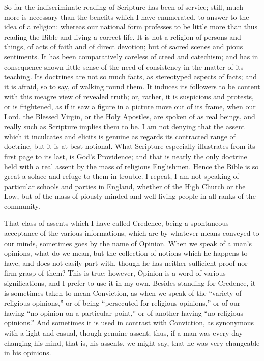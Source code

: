 So far the indiscriminate reading of Scripture has been of service;
still, much more is necessary than the benefits which I have
enumerated, to answer to the idea of a religion; whereas our national
form professes to be little more than thus reading the Bible and
living a correct life. It is not a religion of persons and things, of
acts of faith and of direct devotion; but of sacred scenes and pious
sentiments. It has been comparatively careless of creed and catechism;
and has in consequence shown little sense of the need of consistency
in the matter of its teaching. Its doctrines are not so much facts, as
stereotyped aspects of facts; and it is afraid, so to say, of walking
round them. It induces its followers to be content with this meagre
view of revealed truth; or, rather, it is suspicious and protests, or
is frightened, as if it saw a figure in a picture move out of its
frame, when our Lord, the Blessed Virgin, or the Holy Apostles, are
spoken of as real beings, and really such as Scripture implies them to
be. I am not denying that the assent which it inculcates and elicits
is genuine as regards its contracted range of doctrine, but it is at
best notional. What Scripture especially illustrates from its first
page to its last, is God's Providence; and that is nearly the only
doctrine held with a real assent by the mass of religious Englishmen.
Hence the Bible is so great a solace and refuge to them in trouble. I
repeat, I am not speaking of particular schools and parties in
England, whether of the High Church or the Low, but of the mass
of piously-minded and well-living people in all ranks of the
community.


That class of assents which I have called Credence, being a
spontaneous acceptance of the various informations, which are by
whatever means conveyed to our minds, sometimes goes by the name of
Opinion. When we speak of a man's opinions, what do we mean, but the
collection of notions which he happens to have, and does not easily
part with, though he has neither sufficient proof nor firm grasp of
them? This is true; however, Opinion is a word of various
significations, and I prefer to use it in my own. Besides standing for
Credence, it is sometimes taken to mean Conviction, as when we speak
of the ``variety of religious opinions,'' or of being
``persecuted for religious opinions,'' or of our having
``no opinion on a particular point,'' or of another having
``no religious opinions.'' And sometimes it is used in
contrast with Conviction, as synonymous with a light and casual,
though genuine assent; thus, if a man was every day changing his mind,
that is, his assents, we might say, that he was very changeable in his
opinions.

